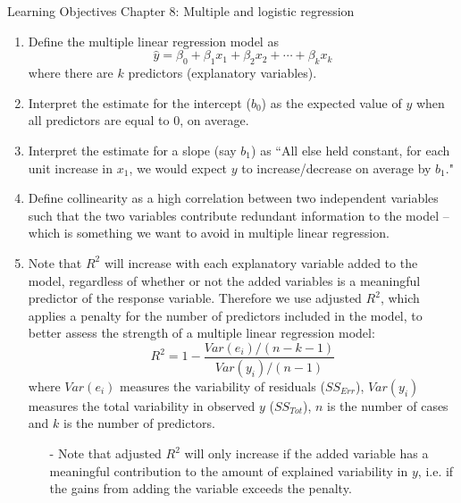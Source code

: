 \documentclass[11pt]{article}
\begin{document}
{\LARGE \textcolor{oiB}{Learning Objectives \hfill Chapter 8: Multiple and logistic regression}} \\

%
\begin{enumerate}
\renewcommand\labelenumi{\textcolor{light}{\textbf{LO \theenumi.}}}

\item Define the multiple linear regression model as
\[ \hat{y} = \beta_0 + \beta_1 x_1 + \beta_2 x_2 + \cdots + \beta_k x_k \]
where there are $k$ predictors (explanatory variables).

\item Interpret the estimate for the intercept ($b_0$) as the expected value of $y$ when all predictors are equal to 0, on average.

\item Interpret the estimate for a slope (say $b_1$) as ``All else held constant, for each unit increase in $x_1$, we would expect $y$ to increase/decrease on average by $b_1$."

\item Define collinearity as a high correlation between two independent variables such that the two variables contribute redundant information to the model -- which is something we want to avoid in multiple linear regression.

\item Note that $R^2$ will increase with each explanatory variable added to the model, regardless of whether or not the added variables is a meaningful predictor of the response variable. Therefore we use adjusted $R^2$, which applies a penalty for the number of predictors included in the model, to better assess the strength of a multiple linear regression model:
\[ R^2 = 1 - \frac{Var(e_i) / (n - k - 1)}{Var(y_i) / (n - 1)} \]
where $Var(e_i)$ measures the variability of residuals ($SS_{Err}$), $Var(y_i)$ measures the total variability in observed $y$ ($SS_{Tot}$), $n$ is the number of cases and $k$ is the number of predictors.
\begin{itemize}
\item[-] Note that adjusted $R^2$ will only increase if the added variable has a meaningful contribution to the amount of explained variability in $y$, i.e. if the gains from adding the variable exceeds the penalty.
\end{itemize}

\end{enumerate}
\end{document}
